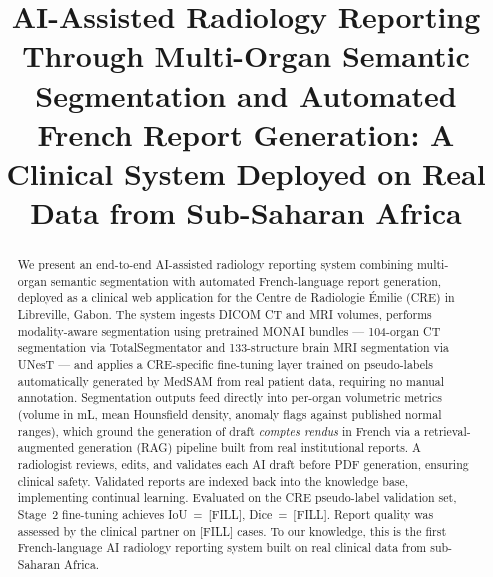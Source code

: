 \documentclass[conference]{IEEEtran}
\begin{document}
\title{AI-Assisted Radiology Reporting Through Multi-Organ Semantic Segmentation
and Automated French Report Generation: A Clinical System Deployed on Real Data
from Sub-Saharan Africa}

\author{
  \and
  \and
}

\maketitle

\begin{abstract}
We present an end-to-end AI-assisted radiology reporting system combining
multi-organ semantic segmentation with automated French-language report
generation, deployed as a clinical web application for the Centre de Radiologie
\'{E}milie (CRE) in Libreville, Gabon. The system ingests DICOM CT and MRI
volumes, performs modality-aware segmentation using pretrained MONAI bundles
--- 104-organ CT segmentation via TotalSegmentator \cite{wasserthal2023} and
133-structure brain MRI segmentation via UNesT \cite{yu2023} --- and applies a
CRE-specific fine-tuning layer trained on pseudo-labels automatically generated
by MedSAM \cite{ma2024} from real patient data, requiring no manual annotation.
Segmentation outputs feed directly into per-organ volumetric metrics (volume in
mL, mean Hounsfield density, anomaly flags against published normal ranges), which
ground the generation of draft \textit{comptes rendus} in French via a
retrieval-augmented generation (RAG) pipeline built from real institutional
reports. A radiologist reviews, edits, and validates each AI draft before PDF
generation, ensuring clinical safety. Validated reports are indexed back into the
knowledge base, implementing continual learning. Evaluated on the CRE pseudo-label
validation set, Stage~2 fine-tuning achieves IoU~=~[FILL], Dice~=~[FILL]. Report
quality was assessed by the clinical partner on [FILL] cases. To our knowledge,
this is the first French-language AI radiology reporting system built on real
clinical data from sub-Saharan Africa.
\end{abstract}
\end{document}
